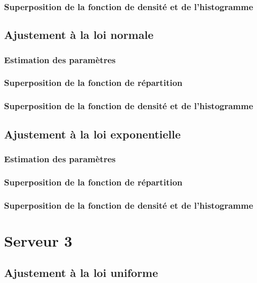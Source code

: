 \documentclass{article}
\begin{document}
\subsubsection{Superposition de la fonction de densité et de l'histogramme}

\subsection{Ajustement à la loi normale}

\subsubsection{Estimation des paramètres}
\subsubsection{Superposition de la fonction de répartition}
\subsubsection{Superposition de la fonction de densité et de l'histogramme}

\subsection {Ajustement à la loi exponentielle}

\subsubsection{Estimation des paramètres}
\subsubsection{Superposition de la fonction de répartition}
\subsubsection{Superposition de la fonction de densité et de l'histogramme}

\section{Serveur 3}

\subsection{Ajustement à la loi uniforme}
\end{document}

